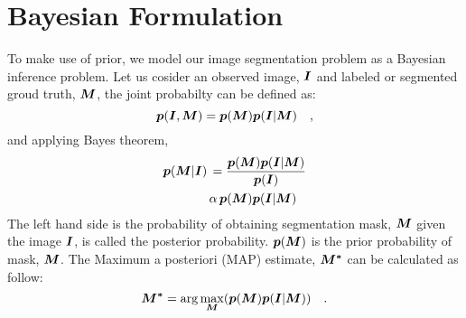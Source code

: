\section{Bayesian Formulation}
To make use of prior, we model our image segmentation problem as a Bayesian inference problem.
Let us cosider an observed image, $\boldsymbol{I}$ and labeled or segmented groud truth, $\boldsymbol{M}$, the joint probabilty can be defined as:
\begin{equation*}
\boldsymbol{p}(\boldsymbol{I}, \boldsymbol{M}) = \boldsymbol{p}(\boldsymbol{M}) \boldsymbol{p}(\boldsymbol{I}|\boldsymbol{M}) \quad ,
\end{equation*}
and applying Bayes theorem,
\begin{align*}
\boldsymbol{p}(\boldsymbol{M}|\boldsymbol{I}) \, & = \frac{\boldsymbol{p}(\boldsymbol{M}) \boldsymbol{p}(\boldsymbol{I}|\boldsymbol{M})}{\boldsymbol{p}(\boldsymbol{I})} \\
						& \alpha \, {\boldsymbol{p}(\boldsymbol{M}) \boldsymbol{p}(\boldsymbol{I}|\boldsymbol{M})}
\end{align*}
The left hand side is the probability of obtaining segmentation mask, $\boldsymbol{M}$ given the image $\boldsymbol{I}$, is called the
posterior probability. $\boldsymbol{p}(\boldsymbol{M})$ is the prior probability of mask, $\boldsymbol{M}$. The Maximum a posteriori (MAP) estimate, $\boldsymbol{M^*}$ can be calculated as follow:
\begin{equation}
\boldsymbol{M^*} = \arg\max_{\boldsymbol{M}}({\boldsymbol{p}(\boldsymbol{M}) \boldsymbol{p}(\boldsymbol{I}|\boldsymbol{M})}) \quad .
\end{equation}

